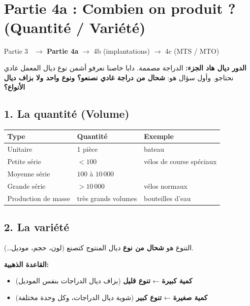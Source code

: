 \documentclass[11pt,a4paper]{article}
\begin{document}
\section*{Partie 4a : Combien on produit ? (Quantité / Variété)}

\begin{carte}
Partie 3 \checkmark\ $\rightarrow$ \textbf{Partie 4a} $\rightarrow$ 4b (implantations) $\rightarrow$ 4c (MTS / MTO)

\begin{Arabic}
\textbf{الدور ديال هاد الجزء:} الدراجة مصممة. دابا خاصنا نعرفو أشمن نوع ديال المعمل غادي نحتاجو.
وأول سؤال هو: \textbf{شحال من دراجة غادي نصنعو؟ ونوع واحد ولا بزاف ديال الأنواع؟}
\end{Arabic}
\end{carte}

\subsection*{1. La quantité (Volume)}
\begin{center}
\begin{tabular}{lll}
\toprule
\textbf{Type} & \textbf{Quantité} & \textbf{Exemple} \\
\midrule
Unitaire & 1 pièce & bateau \\
Petite série & $< 100$ & vélos de course spéciaux \\
Moyenne série & $100$ à $10\,000$ & \\
Grande série & $> 10\,000$ & vélos normaux \\
Production de masse & très grands volumes & bouteilles d'eau \\
\bottomrule
\end{tabular}
\end{center}

\subsection*{2. La variété}
\begin{Arabic}
التنوع هو \textbf{شحال من نوع} ديال المنتوج كتصنع (لون، حجم، موديل…).

\textbf{القاعدة الذهبية:}
\begin{itemize}
\item \textbf{كمية كبيرة} ← \textbf{تنوع قليل} (بزاف ديال الدراجات بنفس الموديل)
\item \textbf{كمية صغيرة} ← \textbf{تنوع كبير} (شوية ديال الدراجات، وكل وحدة مختلفة)
\end{itemize}
\end{Arabic}
\end{document}
